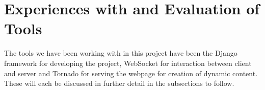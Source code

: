 \section{Experiences with and Evaluation of Tools}
The tools we have been working with in this project have been the Django framework for developing the project, WebSocket for interaction between client and server and Tornado for serving the webpage for creation of dynamic content. These will each be discussed in further detail in the subsections to follow.



